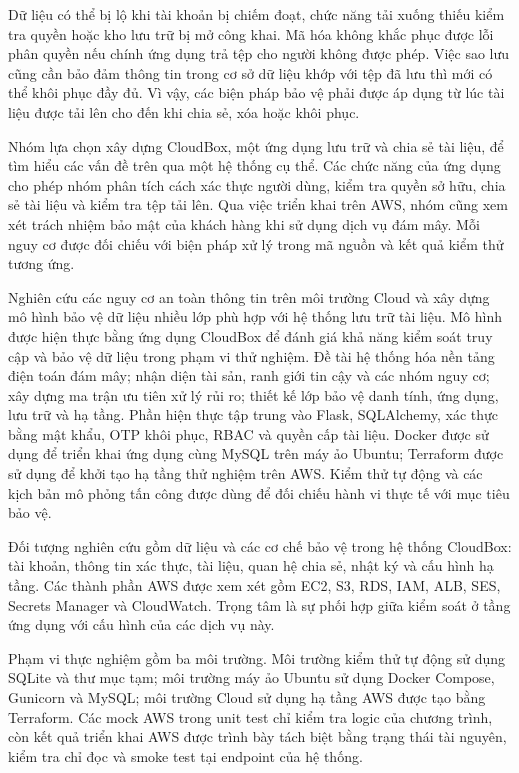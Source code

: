 Dữ liệu có thể bị lộ khi tài khoản bị chiếm đoạt, chức năng tải xuống thiếu kiểm tra quyền hoặc kho lưu trữ bị mở công khai. Mã hóa không khắc phục được lỗi phân quyền nếu chính ứng dụng trả tệp cho người không được phép. Việc sao lưu cũng cần bảo đảm thông tin trong cơ sở dữ liệu khớp với tệp đã lưu thì mới có thể khôi phục đầy đủ. Vì vậy, các biện pháp bảo vệ phải được áp dụng từ lúc tài liệu được tải lên cho đến khi chia sẻ, xóa hoặc khôi phục.

Nhóm lựa chọn xây dựng CloudBox, một ứng dụng lưu trữ và chia sẻ tài liệu, để tìm hiểu các vấn đề trên qua một hệ thống cụ thể. Các chức năng của ứng dụng cho phép nhóm phân tích cách xác thực người dùng, kiểm tra quyền sở hữu, chia sẻ tài liệu và kiểm tra tệp tải lên. Qua việc triển khai trên AWS, nhóm cũng xem xét trách nhiệm bảo mật của khách hàng khi sử dụng dịch vụ đám mây. Mỗi nguy cơ được đối chiếu với biện pháp xử lý trong mã nguồn và kết quả kiểm thử tương ứng.

Nghiên cứu các nguy cơ an toàn thông tin trên môi trường Cloud và xây dựng mô hình bảo vệ dữ liệu nhiều lớp phù hợp với hệ thống lưu trữ tài liệu. Mô hình được hiện thực bằng ứng dụng CloudBox để đánh giá khả năng kiểm soát truy cập và bảo vệ dữ liệu trong phạm vi thử nghiệm.
Đề tài hệ thống hóa nền tảng điện toán đám mây; nhận diện tài sản, ranh giới tin cậy và các nhóm nguy cơ; xây dựng ma trận ưu tiên xử lý rủi ro; thiết kế lớp bảo vệ danh tính, ứng dụng, lưu trữ và hạ tầng. Phần hiện thực tập trung vào Flask, SQLAlchemy, xác thực bằng mật khẩu, OTP khôi phục, RBAC và quyền cấp tài liệu. Docker được sử dụng để triển khai ứng dụng cùng MySQL trên máy ảo Ubuntu; Terraform được sử dụng để khởi tạo hạ tầng thử nghiệm trên AWS. Kiểm thử tự động và các kịch bản mô phỏng tấn công được dùng để đối chiếu hành vi thực tế với mục tiêu bảo vệ.

Đối tượng nghiên cứu gồm dữ liệu và các cơ chế bảo vệ trong hệ thống CloudBox: tài khoản, thông tin xác thực, tài liệu, quan hệ chia sẻ, nhật ký và cấu hình hạ tầng. Các thành phần AWS được xem xét gồm EC2, S3, RDS, IAM, ALB, SES, Secrets Manager và CloudWatch. Trọng tâm là sự phối hợp giữa kiểm soát ở tầng ứng dụng với cấu hình của các dịch vụ này.

Phạm vi thực nghiệm gồm ba môi trường. Môi trường kiểm thử tự động sử dụng SQLite và thư mục tạm; môi trường máy ảo Ubuntu sử dụng Docker Compose, Gunicorn và MySQL; môi trường Cloud sử dụng hạ tầng AWS được tạo bằng Terraform. Các mock AWS trong unit test chỉ kiểm tra logic của chương trình, còn kết quả triển khai AWS được trình bày tách biệt bằng trạng thái tài nguyên, kiểm tra chỉ đọc và smoke test tại endpoint của hệ thống.

